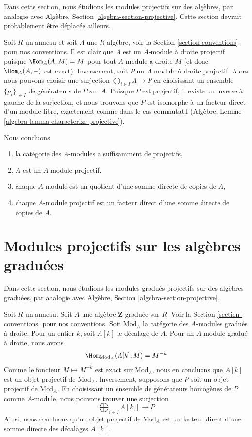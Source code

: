 \noindent
Dans cette section, nous étudions les modules projectifs sur des algèbres,
par analogie avec Algèbre, Section \ref{algebra-section-projective}. Cette section
devrait probablement être déplacée ailleurs.

\medskip\noindent
Soit $R$ un anneau et soit $A$ une $R$-algèbre, voir la Section
\ref{section-conventions} pour nos conventions. Il est clair que $A$ est un
$A$-module à droite projectif puisque $\Hom_A(A, M) = M$ pour tout $A$-module à
droite $M$ (et donc $\Hom_A(A, -)$ est exact). Inversement, soit $P$ un $A$-module
à droite projectif. Alors nous pouvons choisir une surjection $\bigoplus_{i \in I}
A \to P$ en choisissant un ensemble $\{p_i\}_{i \in I}$ de générateurs de $P$ sur
$A$. Puisque $P$ est projectif, il existe un inverse à gauche de la surjection, et
nous trouvons que $P$ est isomorphe à un facteur direct d'un module libre,
exactement comme dans le cas commutatif (Algèbre, Lemme
\ref{algebra-lemma-characterize-projective}).

\medskip\noindent
Nous concluons
\begin{enumerate}
\item la catégorie des $A$-modules a suffisamment de projectifs,
\item $A$ est un $A$-module projectif.
\item chaque $A$-module est un quotient d'une somme directe de copies de $A$,
\item chaque $A$-module projectif est un facteur direct d'une somme directe de
copies de $A$.
\end{enumerate}



\section{Modules projectifs sur les algèbres graduées}
\label{section-projectives-over-graded-algebras}

\noindent
Dans cette section, nous étudions les modules gradués projectifs sur des algèbres
graduées, par analogie avec Algèbre, Section \ref{algebra-section-projective}.

\medskip\noindent
Soit $R$ un anneau. Soit $A$ une algèbre $\mathbf{Z}$-graduée sur $R$. Voir la Section
\ref{section-conventions} pour nos conventions. Soit $\text{Mod}_A$ la catégorie
des $A$-modules gradués à droite. Pour un entier $k$, soit $A[k]$ le décalage de
$A$. Pour un $A$-module gradué à droite, nous avons
$$
\Hom_{\text{Mod}_A}(A[k], M) = M^{-k}
$$
Comme le foncteur $M \mapsto M^{-k}$ est exact sur $\text{Mod}_A$, nous en
concluons que $A[k]$ est un objet projectif de $\text{Mod}_A$. Inversement,
supposons que $P$ soit un objet projectif de $\text{Mod}_A$. En choisissant un
ensemble de générateurs homogènes de $P$ comme $A$-module, nous pouvons trouver
une surjection
$$
\bigoplus\nolimits_{i \in I} A[k_i] \longrightarrow P
$$
Ainsi, nous concluons qu’un objet projectif de $\text{Mod}_A$ est un facteur
direct d’une somme directe des décalages $A[k]$.

